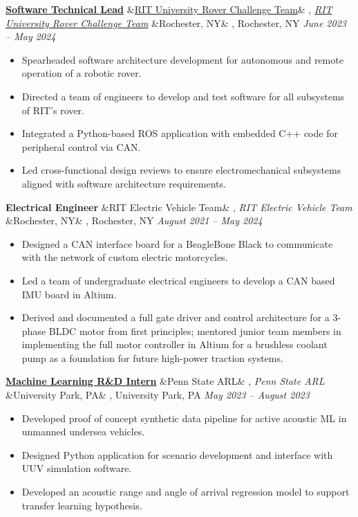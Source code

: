 \documentclass[letterpaper,10pt]{article}
\newcommand{\experience}[5]{%
    \noindent\textbf{#1}%
    \ifx&#2&
    \else
        , \textit{#2}%
    \fi
    \ifx&#3&
    \else
        , #3%
    \fi
    \hfill \textit{#4} \\
    \vspace{-6.8mm}%
    \begin{itemize}[itemsep=-5pt]
        \setlength{\itemindent}{0em}
        #5
    \end{itemize}
    \vspace{1mm}
}
\begin{document}
\experience
    {\href{https://ryanbarry.me/projects/robotics/rover/}{Software Technical Lead}}
    {\href{https://ryanbarry.me/projects/robotics/rover/}{RIT University Rover Challenge Team}}
    {Rochester, NY}
    {June 2023 – May 2024}
    {
        \item Spearheaded software architecture development for autonomous and remote operation of a robotic rover.
        \item Directed a team of engineers to develop and test software for all subsystems of RIT’s rover.
        \item Integrated a Python-based ROS application with embedded C++ code for peripheral control via CAN.
        \item Led cross-functional design reviews to ensure electromechanical subsystems aligned with software architecture requirements.
    }

\experience
    {Electrical Engineer}
    {RIT Electric Vehicle Team}
    {Rochester, NY}
    {August 2021 – May 2024}
    {
        \item Designed a CAN interface board for a BeagleBone Black to communicate with the network of custom electric motorcycles.
        \item Led a team of undergraduate electrical engineers to develop a CAN based IMU board in Altium. 
        \item Derived and documented a full gate driver and control architecture for a 3-phase BLDC motor from first principles; mentored junior team members in implementing the full motor controller in Altium for a brushless coolant pump as a foundation for future high-power traction systems.

    }

\experience
    {\href{https://ryanbarry.me/projects/ai-ml/sonar-data-pipeline/}{Machine Learning R\&D Intern}}
    {Penn State ARL}
    {University Park, PA}
    {May 2023 – August 2023}
    {
        \item Developed proof of concept synthetic data pipeline for active acoustic ML in unmanned undersea vehicles.
        \item Designed Python application for scenario development and interface with UUV simulation software.
        \item Developed an acoustic range and angle of arrival regression model to support transfer learning hypothesis.
    }
\end{document}
